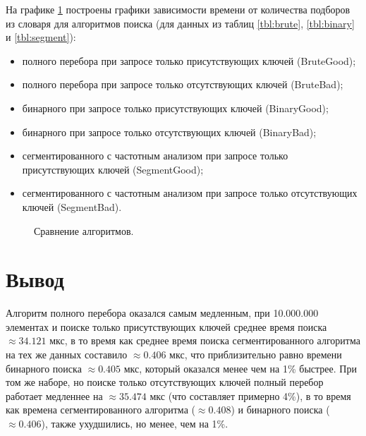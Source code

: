 На графике \ref{plt:time} построены графики зависимости времени от количества подборов из словаря для алгоритмов поиска (для данных из таблиц \ref{tbl:brute}, \ref{tbl:binary} и \ref{tbl:segment}):
\begin{itemize}
    \item полного перебора при запросе только присутствующих ключей (BruteGood);
    \item полного перебора при запросе только отсутствующих ключей (BruteBad);
    \item бинарного при запросе только присутствующих ключей (BinaryGood);
    \item бинарного при запросе только отсутствующих ключей (BinaryBad);
    \item сегментированного с частотным анализом при запросе только присутствующих ключей (SegmentGood);
    \item сегментированного с частотным анализом при запросе только отсутствующих ключей (SegmentBad).
\end{itemize}



\begin{figure}[h]
    \centering
    \captionsetup{justification=centering}
    \caption{Сравнение алгоритмов.}
    \label{plt:time}
\end{figure}


\section*{Вывод}

Алгоритм полного перебора оказался самым медленным, при 10.000.000 элементах и поиске только присутствующих ключей среднее время поиска $\approx 34.121$ мкс, в то время как среднее время поиска сегментированного алгоритма на тех же данных составило $\approx 0.406$ мкс, что приблизительно равно времени бинарного поиска $\approx 0.405$ мкс, который оказался менее чем на 1\% быстрее. При том же наборе, но поиске только отсутствующих ключей полный перебор работает медленнее на $\approx 35.474$ мкс (что составляет примерно 4\%), в то время как времена сегментированного алгоритма ($\approx 0.408$) и бинарного поиска ($\approx 0.406$), также ухудшились, но менее, чем на 1\%.
